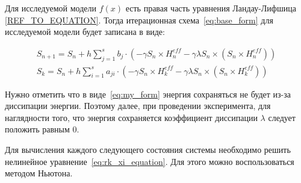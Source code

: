 Для исследуемой модели $f(x)$ есть правая часть уравнения
Ландау-Лифшица \ref{REF_TO_EQUATION}.
Тогда итерационная схема~\ref{eq:base_form} для исследуемой модели
будет записана в виде:

\begin{gather}
    S_{n+1} = S_n + h\sum_{j=1}^s b_j \cdot
    \left(-\gamma S_n \times H^{eff}_n - \gamma\lambda S_n \times
    \left( S_n \times H^{eff}_n\right)\right)
    \label{eq:my_form}\\
    S_{k} = S_n + h\sum_{i=1}^s a_{ji}\cdot \left(
        -\gamma S_n \times H^{eff}_{k} - \gamma\lambda S_n \times
    \left(S_n \times H^{eff}_{k}\right)\right)
    \label{eq:rk_xi_equation}
\end{gather}

\begin{remark}
    Нужно отметить что в виде~\ref{eq:my_form} энергия сохраняться не будет из-за
    диссипации энергии. Поэтому далее, при проведении эксперимента, для наглядности того,
    что энергия сохраняется коэффициент диссипации $\lambda$ следует положить
    равным $0$.
\end{remark}

Для вычисления каждого следующего состояния системы необходимо решить
нелинейное уравнение~\ref{eq:rk_xi_equation}. Для этого можно воспользоваться
методом Ньютона.


